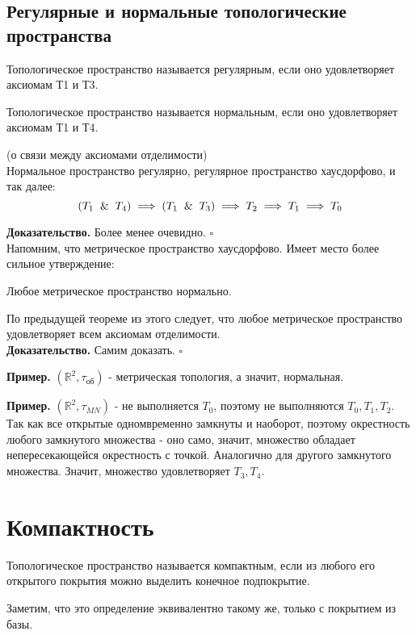 \subsection{Регулярные и нормальные топологические пространства}
\begin{defin}
Топологическое пространство называется регулярным, если оно удовлетворяет
аксиомам Т1 и Т3.
\end{defin}
\begin{defin}
Топологическое пространство называется нормальным, если оно удовлетворяет
аксиомам Т1 и Т4.
\end{defin}
\begin{theor}
    (о связи между аксиомами отделимости)\\
    Нормальное пространство регулярно, регулярное пространство
    хаусдорфово, и так далее:
    $$(T_1\And T_4)\implies(T_1\And T_3)\implies T_2\implies T_1\implies T_0$$
\end{theor}
\textbf{Доказательство.} Более менее очевидно. $\square$\\
Напомним, что метрическое пространство хаусдорфово. Имеет место более сильное
утверждение:
\begin{theor}
Любое метрическое пространство нормально.
\end{theor}
По предыдущей теореме из этого следует, что любое метрическое пространство 
удовлетворяет всем аксиомам отделимости. \\
\textbf{Доказательство.}  Самим доказать. $\square$ 

\textbf{Пример.} $(\mathbb{R}^2,\tau_\text{об})$ - метрическая топология, а 
значит, нормальная.

\textbf{Пример.} $(\mathbb{R}^2,\tau_{MN})$ - не выполняется $T_0$, 
поэтому не выполняются $T_0,T_1,T_2$. Так как все открытые одномвременно
замкнуты и наоборот, поэтому окрестность любого замкнутого множества - оно
само, значит, множество обладает непересекающейся окрестность с точкой. 
Аналогично для другого замкнутого множества. Значит, множество
удовлетворяет $T_3,T_4$. 

\section{Компактность}
\begin{defin}
Топологическое пространство называется компактным, если из любого его 
открытого покрытия можно выделить конечное подпокрытие.
\end{defin}
Заметим, что это определение эквивалентно такому же, только с покрытием из
базы.

